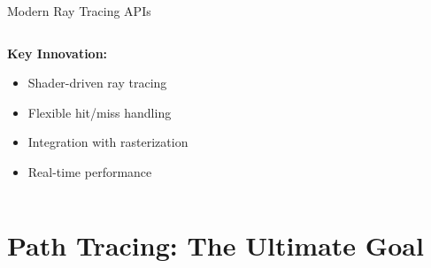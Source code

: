 \begin{frame}{Modern Ray Tracing APIs}
\begin{columns}
\begin{column}{0.5\textwidth}

            \vspace{0.5cm}
            \textbf{Key Innovation:}
            \begin{itemize}
                \item Shader-driven ray tracing
                \item Flexible hit/miss handling
                \item Integration with rasterization
                \item Real-time performance
            \end{itemize}
        \end{column}
    \end{columns}
\end{frame}

\section{Path Tracing: The Ultimate Goal}


